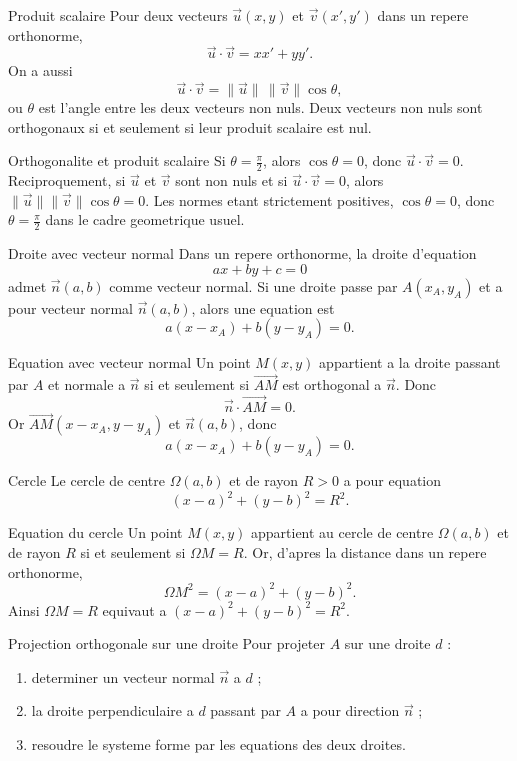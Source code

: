 \documentclass[11pt,a4paper]{article}
\newcommand{\vect}[1]{\overrightarrow{#1}}
\begin{document}
\begin{boitecours}{Produit scalaire}
Pour deux vecteurs $\vec u(x,y)$ et $\vec v(x',y')$ dans un repere orthonorme,
\[
\vec u\cdot\vec v=xx'+yy'.
\]
On a aussi
\[
\vec u\cdot\vec v=\|\vec u\|\,\|\vec v\|\cos\theta,
\]
ou $\theta$ est l'angle entre les deux vecteurs non nuls.
Deux vecteurs non nuls sont orthogonaux si et seulement si leur produit scalaire est nul.
\end{boitecours}

\begin{boitepreuve}{Orthogonalite et produit scalaire}
Si $\theta=\frac\pi2$, alors $\cos\theta=0$, donc $\vec u\cdot\vec v=0$. Reciproquement, si $\vec u$ et $\vec v$ sont non nuls et si $\vec u\cdot\vec v=0$, alors $\|\vec u\|\|\vec v\|\cos\theta=0$. Les normes etant strictement positives, $\cos\theta=0$, donc $\theta=\frac\pi2$ dans le cadre geometrique usuel.
\end{boitepreuve}

\begin{boitecours}{Droite avec vecteur normal}
Dans un repere orthonorme, la droite d'equation
\[
ax+by+c=0
\]
admet $\vec n(a,b)$ comme vecteur normal.
Si une droite passe par $A(x_A,y_A)$ et a pour vecteur normal $\vec n(a,b)$, alors une equation est
\[
a(x-x_A)+b(y-y_A)=0.
\]
\end{boitecours}

\begin{boitepreuve}{Equation avec vecteur normal}
Un point $M(x,y)$ appartient a la droite passant par $A$ et normale a $\vec n$ si et seulement si $\vect{AM}$ est orthogonal a $\vec n$. Donc
\[
\vec n\cdot\vect{AM}=0.
\]
Or $\vect{AM}(x-x_A,y-y_A)$ et $\vec n(a,b)$, donc
\[
a(x-x_A)+b(y-y_A)=0.
\]
\end{boitepreuve}

\begin{boitecours}{Cercle}
Le cercle de centre $\Omega(a,b)$ et de rayon $R>0$ a pour equation
\[
(x-a)^2+(y-b)^2=R^2.
\]
\end{boitecours}

\begin{boitepreuve}{Equation du cercle}
Un point $M(x,y)$ appartient au cercle de centre $\Omega(a,b)$ et de rayon $R$ si et seulement si $\Omega M=R$. Or, d'apres la distance dans un repere orthonorme,
\[
\Omega M^2=(x-a)^2+(y-b)^2.
\]
Ainsi $\Omega M=R$ equivaut a $(x-a)^2+(y-b)^2=R^2$.
\end{boitepreuve}

\begin{boitemethode}{Projection orthogonale sur une droite}
Pour projeter $A$ sur une droite $d$ :
\begin{enumerate}
  \item determiner un vecteur normal $\vec n$ a $d$ ;
  \item la droite perpendiculaire a $d$ passant par $A$ a pour direction $\vec n$ ;
  \item resoudre le systeme forme par les equations des deux droites.
\end{enumerate}
\end{boitemethode}
\end{document}
